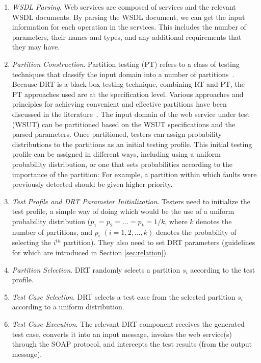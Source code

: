 \documentclass[10pt,journal,compsoc]{IEEEtran}
\begin{document}
\begin{enumerate}[1)]
  \item
  \emph{WSDL Parsing}.
  Web services are composed of services and the relevant WSDL documents.
  By parsing the WSDL document, we can get the input information for each operation in the services.
  This includes the number of parameters, their names and types, and any additional requirements that they may have.

  \item
  \emph{Partition Construction}.
  Partition testing (PT) refers to a class of testing techniques that classify the input domain into a number of partitions~\cite{weyuker1991analyzing}.
  Because DRT is a black-box testing technique, combining RT and PT, the PT approaches used are at the specification level.
  Various approaches and principles for achieving convenient and effective partitions have been discussed in the literature~\cite{weyuker1991analyzing, cai2005partition, chen1994relationship, chen1996expected}.
  The input domain of the web service under test (WSUT) can be partitioned based on the WSUT specifications and the parsed parameters.
  Once partitioned, testers can assign probability distributions to the partitions as an initial testing profile.
  This initial testing profile can be assigned in different ways, including using a uniform probability distribution, or one that sets probabilities according to the importance of the partition:
  For example, a partition within which faults were previously detected should be given higher priority.

  \item
  \emph{Test Profile and DRT Parameter Initialization}.
  Testers need to initialize the test profile, a simple way of doing which would be the use of a uniform probability distribution ($p_1 = p_2 = \ldots = p_k = 1 / k$, where $k$ denotes the number of partitions, and $p_i$ $(i = 1,2, \ldots, k)$ denotes the probability of selecting the $i^{th}$ partition). They also need to set DRT parameters (guidelines for which are introduced in Section \ref{sec:relation}).

  \item
  \emph{Partition Selection}.
  DRT randomly selects a partition $s_i$ according to the test profile.

  \item
  \emph{Test Case Selection}.
  DRT selects a test case from the selected partition $s_i$ according to a uniform distribution.

  \item
  \emph{Test Case Execution}.
  The relevant DRT component receives the generated test case, converts it into an input message, invokes the web service(s) through the SOAP protocol, and intercepts the test results (from the output message).


\end{enumerate}
\end{document}

